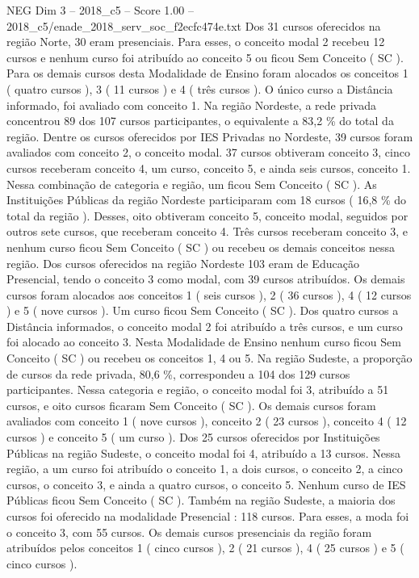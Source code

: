 \begin{textsample}{NEG Dim 3 – 2018\_c5 – Score 1.00 – 2018\_c5/enade\_2018\_serv\_soc\_f2ecfc474e.txt}
Dos 31 cursos oferecidos na região Norte, 30 eram presenciais.
Para esses, o conceito modal 2 recebeu 12 cursos e nenhum curso foi atribuído ao conceito 5 ou ficou Sem Conceito ( SC ).
Para os demais cursos desta Modalidade de Ensino foram alocados os conceitos 1 ( quatro cursos ), 3 ( 11 cursos ) e 4 ( três cursos ).
O único curso a Distância informado, foi avaliado com conceito 1.
Na região Nordeste, a rede privada concentrou 89 dos 107 cursos participantes, o equivalente a 83,2 \% do total da região.
Dentre os cursos oferecidos por IES Privadas no Nordeste, 39 cursos foram avaliados com conceito 2, o conceito modal. 37 cursos obtiveram conceito 3, cinco cursos receberam conceito 4, um curso, conceito 5, e ainda seis cursos, conceito 1.
Nessa combinação de categoria e região, um ficou Sem Conceito ( SC ).
As Instituições Públicas da região Nordeste participaram com 18 cursos ( 16,8 \% do total da região ).
Desses, oito obtiveram conceito 5, conceito modal, seguidos por outros sete cursos, que receberam conceito 4.
Três cursos receberam conceito 3, e nenhum curso ficou Sem Conceito ( SC ) ou recebeu os demais conceitos nessa região.
Dos cursos oferecidos na região Nordeste 103 eram de Educação Presencial, tendo o conceito 3 como modal, com 39 cursos atribuídos.
Os demais cursos foram alocados aos conceitos 1 ( seis cursos ), 2 ( 36 cursos ), 4 ( 12 cursos ) e 5 ( nove cursos ).
Um curso ficou Sem Conceito ( SC ).
Dos quatro cursos a Distância informados, o conceito modal 2 foi atribuído a três cursos, e um curso foi alocado ao conceito 3.
Nesta Modalidade de Ensino nenhum curso ficou Sem Conceito ( SC ) ou recebeu os conceitos 1, 4 ou 5.
Na região Sudeste, a proporção de cursos da rede privada, 80,6 \%, correspondeu a 104 dos 129 cursos participantes.
Nessa categoria e região, o conceito modal foi 3, atribuído a 51 cursos, e oito cursos ficaram Sem Conceito ( SC ).
Os demais cursos foram avaliados com conceito 1 ( nove cursos ), conceito 2 ( 23 cursos ), conceito 4 ( 12 cursos ) e conceito 5 ( um curso ).
Dos 25 cursos oferecidos por Instituições Públicas na região Sudeste, o conceito modal foi 4, atribuído a 13 cursos.
Nessa região, a um curso foi atribuído o conceito 1, a dois cursos, o conceito 2, a cinco cursos, o conceito 3, e ainda a quatro cursos, o conceito 5.
Nenhum curso de IES Públicas ficou Sem Conceito ( SC ).
Também na região Sudeste, a maioria dos cursos foi oferecido na modalidade Presencial : 118 cursos.
Para esses, a moda foi o conceito 3, com 55 cursos.
Os demais cursos presenciais da região foram atribuídos pelos conceitos 1 ( cinco cursos ), 2 ( 21 cursos ), 4 ( 25 cursos ) e 5 ( cinco cursos ).

\end{textsample}
